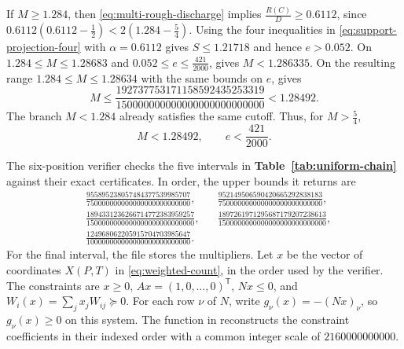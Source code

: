 \documentclass[preprint,11pt,numbers]{elsarticle-arxiv}
\numberwithin{equation}{section}
\theoremstyle{definition}
\begin{document}
If $M\geq1.284$, then \eqref{eq:multi-rough-discharge} implies
$\frac{R(C)}{D}\geq0.6112$, since
$0.6112(0.6112-\frac{1}{2})<2(1.284-\frac{5}{4})$.
Using the four inequalities in \eqref{eq:support-projection-four}
with $\alpha=0.6112$ gives $S\leq1.21718$ and hence $e>0.052$.
On $1.284\leq M\leq1.28683$ and
$0.052\leq e\leq\frac{421}{2000}$, 
gives $M<1.286335$. On the resulting range
$1.284\leq M\leq1.28634$ with the same bounds on $e$,
 gives
\[
 M\leq\frac{192737753171158592435253319}
             {150000000000000000000000000}<1.28492.
\]
The branch $M<1.284$ already satisfies the same cutoff. Thus, for
$M>\frac{5}{4}$,
\begin{equation}\label{eq:initial-uniform-bounds}
 M<1.28492,\qquad e<\frac{421}{2000}.
\end{equation}

The six-position verifier
 checks the five intervals in
\textbf{Table~\ref{tab:uniform-chain}} against their exact
certificates. In order, the upper bounds it returns are
\[
\begin{aligned}
 &\frac{955895238057484377539985707}{750000000000000000000000000},
 &&\frac{952149506590420665292838183}{750000000000000000000000000},\\
 &\frac{1894331236266714772383959257}{1500000000000000000000000000},
 &&\frac{1897261971295687179207238613}{1500000000000000000000000000},\\
 &\frac{124968062205915704703985647}{100000000000000000000000000}.
\end{aligned}
\]
For the final interval, the file
 stores the
multipliers. Let $x$ be the vector of coordinates
$X(P,T)$ in \eqref{eq:weighted-count}, in the order used by
the verifier. The constraints are $x\geq0$,
$Ax=(1,0,\ldots,0)^{\mathsf T}$, $Nx\leq0$, and
$W_i(x)=\sum_j x_jW_{ij}\succeq0$. For each row $\nu$ of $N$,
write $g_\nu(x)=-(Nx)_\nu$, so $g_\nu(x)\geq0$ on this system.
The  function in 
reconstructs the constraint coefficients in their indexed order
with a common integer scale of $2160000000000$.
\end{document}
